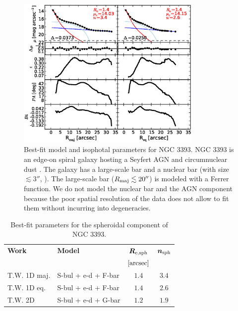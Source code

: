\documentclass[preprint2]{emulateapj}
\newcommand{\fitfigurewidth}{0.8\textwidth}
\begin{document}
  \begin{figure}[h]
  \begin{center}
  \includegraphics[width=\fitfigurewidth]{images/n3393_1Dfit.eps}
  \caption{Best-fit model and isophotal parameters for NGC 3393.
  NGC 3393 is an edge-on spiral galaxy hosting a Seyfert AGN \citep{diaz1988n3393} and 
  circumnuclear dust \citep{martini2003}.
  The galaxy has a large-scale bar and a nuclear bar (with size $\lesssim 3''$, \citealt{erwin2004}).  
  The large-scale bar ($R_{\rm maj} \lesssim 20''$) is modeled with a Ferrer function.
  We do not model the nuclear bar and the AGN component because the poor spatial resolution of the data does not allow to fit them 
  without incurring into degeneracies.
  }
  \end{center}
  \end{figure}

  \begin{table}[h]
  \small
  \caption{Best-fit parameters for the spheroidal component of NGC 3393.}
  \begin{center}
  \begin{tabular}{llcc}
  \hline
  {\bf Work} & {\bf Model}   & $\bm R_{\rm e,sph}$    & $\bm n_{\rm sph}$ \\
    &  &  $[\rm arcsec]$ & \\
  \hline
  T.W. 1D maj. & S-bul + e-d + F-bar & $1.4$  &  $3.4$ \\
  T.W. 1D eq.  & S-bul + e-d + F-bar & $1.4$  &  $2.6$ \\
  T.W. 2D      & S-bul + e-d + G-bar & $1.2$  &  $1.9$ \\
  \hline
  \end{tabular}
  \end{center}
  \label{tab:n3393}
  \end{table}
\end{document}
